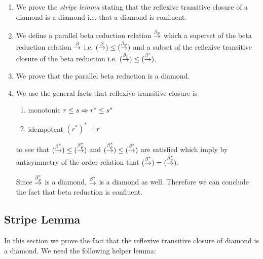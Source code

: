 \begin{enumerate}

    \item We prove the \emph{stripe lemma} stating that the reflexive transitive
    closure of a diamond is a diamond i.e. that a diamond is confluent.

    \item We define a parallel beta reduction relation $\stackrel{\beta_p}{\to}$ which a
    superset of the beta reduction relation $\stackrel{\beta}{\to}$ i.e.  $(\stackrel{\beta}{\to}) \le
    (\stackrel{\beta_p}{\to})$ and a subset of the reflexive transitive closure of the beta
    reduction i.e. $(\stackrel{\beta_p}{\to}) \le (\stackrel{\beta^*}{\to})$.

    \item We prove that the parallel beta reduction is a diamond.

    \item We use the general facts that reflexive transitive closure is
    \begin{enumerate}
        \item monotonic $r \le s \Rightarrow r^* \le s^*$

        \item idempotent $(r^*)^* = r$
    \end{enumerate}
    to see that $(\stackrel{\beta^*}{\to}) \le (\stackrel{\beta_p^*}{\to})$ and $(\stackrel{\beta_p^*}{\to}) \le
    (\stackrel{\beta^*}{\to})$ are satisfied which imply by antisymmetry of the order
    relation that $(\stackrel{\beta^*}{\to}) = (\stackrel{\beta_p^*}{\to})$.

    Since $\stackrel{\beta_p^*}{\to}$ is a diamond, $\stackrel{\beta^*}{\to}$ is a diamond as well.
    Therefore we can conclude the fact that beta reduction is confluent.
\end{enumerate}



\subsection{Stripe Lemma}

In this section we prove the fact that the reflexive transitive closure of
diamond is a diamond. We need the following helper lemma:

